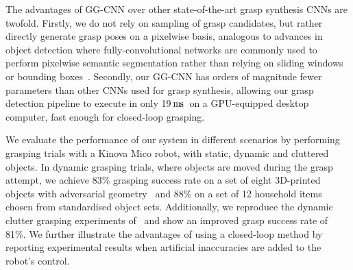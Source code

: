 \documentclass[conference]{IEEEtran}
\newcommand{\pack}	{\hspace{-0.08em}}
\newcommand{\ms}	{\ensuremath{\rm\,m\pack s}}
\begin{document}
The advantages of GG-CNN over other state-of-the-art grasp synthesis CNNs are twofold.  Firstly, we do not rely on sampling of grasp candidates, but rather directly generate grasp poses on a pixelwise basis, analogous to advances in object detection where fully-convolutional networks are commonly used to perform pixelwise semantic segmentation rather than relying on sliding windows or bounding boxes~\cite{long2015fully}.  
Secondly, our GG-CNN has orders of magnitude fewer parameters than other CNNs used for grasp synthesis, allowing our grasp detection pipeline to execute in only 19\ms~on a GPU-equipped desktop computer, fast enough for closed-loop grasping.

We evaluate the performance of our system in different scenarios by performing grasping trials with a Kinova Mico robot, with static, dynamic and cluttered objects.  In dynamic grasping trials, where objects are moved during the grasp attempt, we achieve 83\% grasping success rate on a set of eight 3D-printed objects with adversarial geometry~\cite{Mahler2017Dex2} and 88\% on a set of 12 household items chosen from standardised object sets.  Additionally, we reproduce the dynamic clutter grasping experiments of~\cite{Viereck2017LearningImages} and show an improved grasp success rate of 81\%.  We further illustrate the advantages of using a closed-loop method by reporting experimental results when artificial inaccuracies are added to the robot's control.
\end{document}
